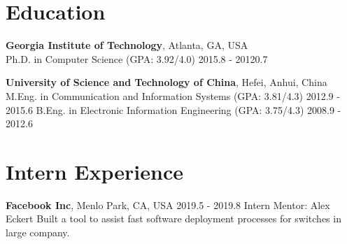 \documentclass[line,11pt,letter]{F:/Dropbox (Personal)/personal-stuffs/CV/LaTeX/includes/cls/myRes}
\begin{document}

\address{266 Ferst Dr, Atlanta, GA 30332, United States}
\address{Cell: +1(404)697-0608. \hspace{5pt} Email: gonglong@gatech.edu}
\begin{resume}


\vspace*{-10pt}
\vspace*{-15pt}
\negspace
\section{Education}
\vspace{-4pt}
{\setlength{\parskip}{0pt}
\textbf{Georgia Institute of Technology}, Atlanta, GA, USA\\
{\hspace*{1em} Ph.D. in Computer Science (GPA: 3.92/4.0) \hspace{52.5pt} \hfill 2015.8 - 20120.7 \break}
}
\sspace

{\setlength{\parskip}{0pt}
\textbf{University of Science and Technology of China}, Hefei, Anhui, China\\
{\hspace*{1em} M.Eng. in Communication and Information Systems (GPA: 3.81/4.3) \hspace{52.5pt} \hfill 2012.9 - 2015.6\break}
{\hspace*{1em} B.Eng. in Electronic Information Engineering (GPA: 3.75/4.3) \hspace{52.5pt} \hfill 2008.9 - 2012.6\break}
}
\negspace
\section{Intern Experience}
\vspace{-4pt}
{\setlength{\parskip}{0pt}
{\bf Facebook Inc}, Menlo Park, CA, USA \hfill 2019.5 - 2019.8\break
{\hspace*{1em} Intern \hfill Mentor: Alex Eckert\break}
{\hspace*{1em} Built a tool to assist fast software deployment processes for switches in large company.  \break}
}\sspace


\end{resume}
\end{document}
